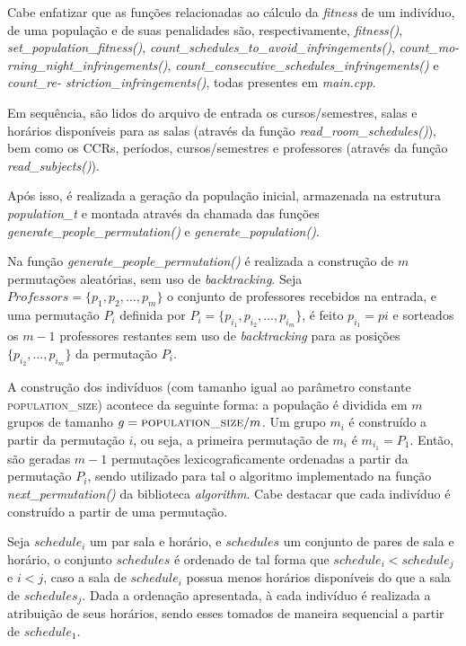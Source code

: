 \documentclass[12pt]{article}
\begin{document}
Cabe enfatizar que as funções relacionadas ao cálculo da \textit{fitness} de um indivíduo, de uma população e de suas penalidades são, respectivamente, \emph{fitness()}, \emph{set\_population\_fitness()}, \emph{count\_schedules\_to\_avoid\_infringements()}, \emph{count\_mo- rning\_night\_infringements()}, \emph{count\_consecutive\_schedules\_infringements()} e \emph{count\_re- striction\_infringements()}, todas presentes em \emph{main.cpp}.

Em sequência, são lidos do arquivo de entrada os cursos/semestres, salas e horários disponíveis para as salas (através da função \emph{read\_room\_schedules()}), bem como os CCRs, períodos, cursos/semestres e professores (através da função \emph{read\_subjects()}).

Após isso, é realizada a geração da população inicial, armazenada na estrutura \emph{population\_t} e montada através da chamada das funções \emph{generate\_people\_permutation()} e \emph{generate\_population()}.

Na função \emph{generate\_people\_permutation()} é realizada a construção de $m$ permutações aleatórias, sem uso de \textit{backtracking}. Seja $Professors = \{p_{1}, p_{2}, . . . , p_{m}\}$ o conjunto de professores recebidos na entrada, e uma permutação $P_{i}$ definida por $P_{i} = \{p_{i_{1}}, p_{i_{2}}, . . . , p_{i_{m}}\}$, é feito $p_{i_{1}} = p{i}$ e sorteados os $m-1$ professores restantes sem uso de \textit{backtracking} para as posições $\{p_{i_{2}}, . . . , p_{i_{m}}\}$ da permutação $P_{i}$.

A construção dos indivíduos (com tamanho igual ao parâmetro constante \textsc{population\_size}) acontece da seguinte forma: a população é dividida em $m$ grupos de tamanho $g = \textsc{population\_size} / m$. Um grupo $m_{i}$ é construído a partir da permutação $i$, ou seja, a primeira permutação de $m_{i}$ é $m_{i_{1}} = P_{1}$. Então, são geradas $m-1$ permutações lexicograficamente ordenadas a partir da permutação $P_{i}$, sendo utilizado para tal o algoritmo implementado na função \emph{next\_permutation()} da biblioteca \emph{algorithm}. Cabe destacar que cada indivíduo é construído a partir de uma permutação.

Seja $schedule_{i}$ um par sala e horário, e $schedules$ um conjunto de pares de sala e horário, o conjunto $schedules$ é ordenado de tal forma que $schedule_{i} < schedule_{j}$ e $i < j$, caso a sala de $schedule_{i}$ possua menos horários disponíveis do que a sala de $schedules_{j}$. Dada a ordenação apresentada, à cada indivíduo é realizada a atribuição de seus horários, sendo esses tomados de maneira sequencial a partir de $schedule_{1}$.
\end{document}
